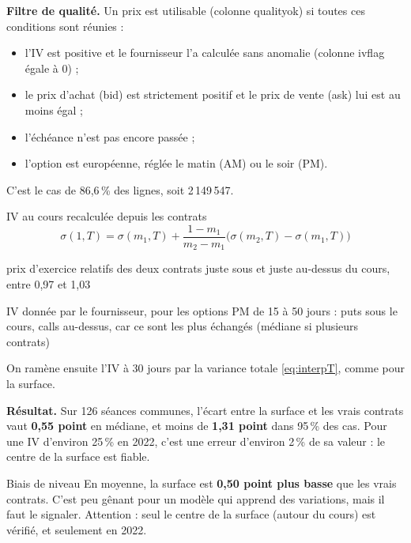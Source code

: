 \documentclass[10pt,a4paper]{article}
\newcommand{\coupure}{\textunderscore\allowbreak}
\newcommand{\fic}[1]{{\small\ttfamily\let\_\coupure #1}}
\newcommand{\notation}[2]{\makebox[2.3cm][l]{#1}\parbox[t]{\dimexpr\linewidth-2.3cm\relax}{#2}\par}
\begin{document}
\textbf{Filtre de qualité.} Un prix est utilisable (colonne \fic{quality\_ok}) si toutes ces conditions sont réunies :
\begin{itemize}[nosep]
\item l'IV est positive et le fournisseur l'a calculée sans anomalie (colonne \fic{iv\_flag} égale à 0) ;
\item le prix d'achat (bid) est strictement positif et le prix de vente (ask) lui est au moins égal ;
\item l'échéance n'est pas encore passée ;
\item l'option est européenne, réglée le matin (AM) ou le soir (PM).
\end{itemize}
C'est le cas de 86,6\,\% des lignes, soit 2\,149\,547.

\begin{formule}{IV au cours recalculée depuis les contrats}
\begin{equation}\label{eq:ivspot}
\sigma(1,T)=\sigma(m_1,T)+\frac{1-m_1}{m_2-m_1}\bigl(\sigma(m_2,T)-\sigma(m_1,T)\bigr)
\end{equation}
\notation{$m_1\le1\le m_2$}{prix d'exercice relatifs des deux contrats juste sous et juste au-dessus du cours, entre 0,97 et 1,03}
\notation{$\sigma(m,T)$}{IV donnée par le fournisseur, pour les options PM de 15 à 50 jours : puts sous le cours, calls au-dessus, car ce sont les plus échangés (médiane si plusieurs contrats)}
On ramène ensuite l'IV à 30 jours par la variance totale \eqref{eq:interpT}, comme pour la surface.
\end{formule}
\textbf{Résultat.} Sur 126 séances communes, l'écart entre la surface et les vrais contrats vaut \textbf{0,55 point} en médiane, et moins de \textbf{1,31 point} dans 95\,\% des cas. Pour une IV d'environ 25\,\% en 2022, c'est une erreur d'environ 2\,\% de sa valeur : le centre de la surface est fiable.

\begin{attention}{Biais de niveau}
En moyenne, la surface est \textbf{0,50 point plus basse} que les vrais contrats. C'est peu gênant pour un modèle qui apprend des variations, mais il faut le signaler. Attention : seul le centre de la surface (autour du cours) est vérifié, et seulement en 2022.
\end{attention}
\end{document}
